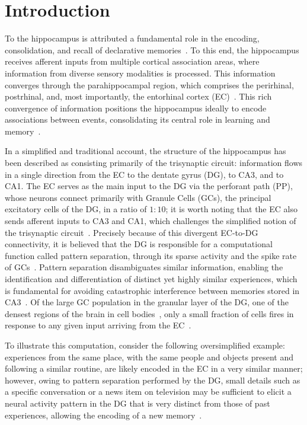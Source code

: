 \chapter{Introduction}\label{cap:introduction}

To the hippocampus is attributed a fundamental role in the encoding, consolidation, and recall of declarative
memories~\parencite{eichenbaumHippocampus1999, liaoLearning2024}. To this end, the hippocampus receives afferent inputs from multiple
cortical association areas, where information from diverse sensory modalities is processed. This information converges through the
parahippocampal region, which comprises the perirhinal, postrhinal, and, most importantly, the entorhinal cortex
(EC)~\parencite{eichenbaumCortical2000}. This rich convergence of information positions the hippocampus ideally to encode associations
between events, consolidating its central role in learning and memory~\parencite{henkeModel2010, berdugo-vegaSharpening2023}.

In a simplified and traditional account, the structure of the hippocampus has been described as consisting primarily of the
trisynaptic circuit: information flows in a single direction from the EC to the dentate gyrus (DG), to CA3, and to CA1. The EC
serves as the main input to the DG via the perforant path (PP), whose neurons connect primarily with Granule Cells (GCs), the
principal excitatory cells of the DG, in a ratio of $1:10$; it is worth noting that the EC also sends afferent inputs to CA3 and
CA1, which challenges the simplified notion of the trisynaptic circuit~\parencite{basuCorticohippocampal2015}. Precisely because
of this divergent EC-to-DG connectivity, it is believed that the DG is responsible for a computational function called pattern
separation, through its sparse activity and the spike rate of GCs~\parencite{hainmuellerDentate2020, kesnerMnemonic2006,
yassaPattern2011}. Pattern separation disambiguates similar information, enabling the identification and differentiation of
distinct yet highly similar experiences, which is fundamental for avoiding catastrophic interference between memories stored in
CA3~\parencite{rollsMechanisms2013}. Of the large GC population in the granular layer of the DG, one of the densest regions of the
brain in cell bodies~\parencite{amaralDentate2007}, only a small fraction of cells fires in response to any given input arriving
from the EC~\parencite{kesnerMnemonic2006, chavlisDendrites2017}.

To illustrate this computation, consider the following oversimplified example: experiences from the same place, with the same
people and objects present and following a similar routine, are likely encoded in the EC in a very similar manner; however, owing
to pattern separation performed by the DG, small details such as a specific conversation or a news item on television may be
sufficient to elicit a neural activity pattern in the DG that is very distinct from those of past experiences, allowing the
encoding of a new memory~\parencite{eichenbaumHippocampus2004}.

